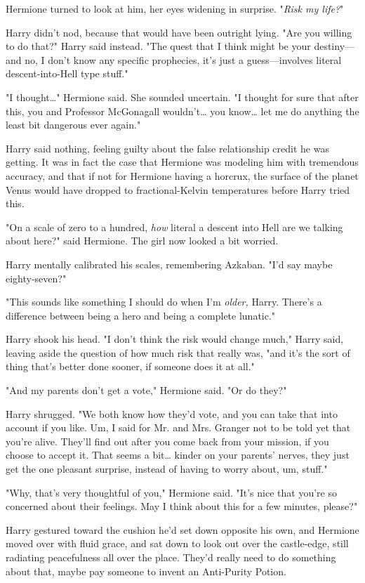 Hermione turned to look at him, her eyes widening in surprise. "\emph{Risk my
life?}"

Harry didn't nod, because that would have been outright lying. "Are you willing
to do that?" Harry said instead. "The quest that I think might be your
destiny---and no, I don't know any specific prophecies, it's just a
guess---involves literal descent-into-Hell type stuff."

"I thought{\ldots}" Hermione said. She sounded uncertain. "I thought for sure
that after this, you and Professor McGonagall wouldn't{\ldots} you know{\ldots}
let me do anything the least bit dangerous ever again."

Harry said nothing, feeling guilty about the false relationship credit he was
getting. It was in fact the case that Hermione was modeling him with tremendous
accuracy, and that if not for Hermione having a horcrux, the surface of the
planet Venus would have dropped to fractional-Kelvin temperatures before Harry
tried this.

"On a scale of zero to a hundred, \emph{how} literal a descent into Hell are we
talking about here?" said Hermione. The girl now looked a bit worried.

Harry mentally calibrated his scales, remembering Azkaban. "I'd say maybe
eighty-seven?"

"This sounds like something I should do when I'm \emph{older,} Harry. There's a
difference between being a hero and being a complete lunatic."

Harry shook his head. "I don't think the risk would change much," Harry said,
leaving aside the question of how much risk that really was, "and it's the sort
of thing that's better done sooner, if someone does it at all."

"And my parents don't get a vote," Hermione said. "Or do they?"

Harry shrugged. "We both know how they'd vote, and you can take that into
account if you like. Um, I said for Mr. and Mrs. Granger not to be told yet that
you're alive. They'll find out after you come back from your mission, if you
choose to accept it. That seems a bit{\ldots} kinder on your parents' nerves,
they just get the one pleasant surprise, instead of having to worry about, um,
stuff."

"Why, that's very thoughtful of you," Hermione said. "It's nice that you're so
concerned about their feelings. May I think about this for a few minutes,
please?"

Harry gestured toward the cushion he'd set down opposite his own, and Hermione
moved over with fluid grace, and sat down to look out over the castle-edge,
still radiating peacefulness all over the place. They'd really need to do
something about that, maybe pay someone to invent an Anti-Purity Potion.

